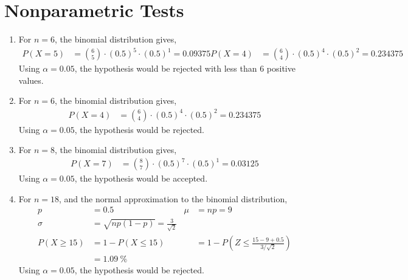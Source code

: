 \section{Nonparametric Tests}

\begin{enumerate}
    \item For $ n = 6 $, the binomial distribution gives,
          \begin{align}
              P(X = 5) & = \binom{6}{5} \cdot (0.5)^5 \cdot (0.5)^1 = 0.09375
              P(X = 4) & = \binom{6}{4} \cdot (0.5)^4 \cdot (0.5)^2 = 0.234375
          \end{align}
          Using $ \alpha = 0.05 $, the hypothesis would be \textcolor{y_p}{rejected}
          with less than 6 positive values.

    \item For $ n = 6 $, the binomial distribution gives,
          \begin{align}
              P(X = 4) & = \binom{6}{4} \cdot (0.5)^4 \cdot (0.5)^2 = 0.234375
          \end{align}
          Using $ \alpha = 0.05 $, the hypothesis would be \textcolor{y_p}{rejected}.

    \item For $ n = 8 $, the binomial distribution gives,
          \begin{align}
              P(X = 7) & = \binom{8}{7} \cdot (0.5)^7 \cdot (0.5)^1 = 0.03125
          \end{align}
          Using $ \alpha = 0.05 $, the hypothesis would be \textcolor{y_h}{accepted}.

    \item For $ n = 18 $, and the normal approximation to the binomial distribution,
          \begin{align}
              p            & = 0.5                                                &
              \mu          & = np = 9                                               \\
              \sigma       & = \sqrt{np(1-p)} = \frac{3}{\sqrt{2}}                  \\
              P(X \geq 15) & = 1 - P(X \leq 15)                                   &
                           & = 1 - P\left( Z \leq \frac{15 - 9 + 0.5}{3/\sqrt{2}}
              \right)                                                               \\
                           & = \SI{1.09}{\percent}
          \end{align}
          Using $ \alpha = 0.05 $, the hypothesis would be \textcolor{y_p}{rejected}.


\end{enumerate}
